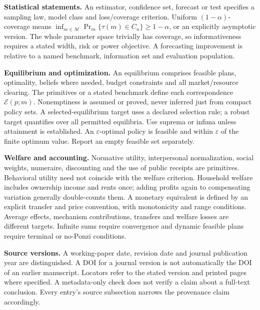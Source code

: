 \documentclass[11pt,a4paper]{article}
\begin{document}
\textbf{Statistical statements.} An estimator, confidence set, forecast or test specifies a sampling law, model class and loss/coverage criterion. Uniform \((1-\alpha)\)-coverage means \(\inf_{m\in\mathcal M}\Pr_m\{\tau(m)\in C_n\}\geq1-\alpha\), or an explicitly asymptotic version. The whole parameter space trivially has coverage, so informativeness requires a stated width, risk or power objective. A forecasting improvement is relative to a named benchmark, information set and evaluation population.

\textbf{Equilibrium and optimization.} An equilibrium comprises feasible plans, optimality, beliefs where needed, budget constraints and all market/resource clearing. The primitives or a stated benchmark define each correspondence \(\mathcal E(p;m)\). Nonemptiness is assumed or proved, never inferred just from compact policy sets. A selected-equilibrium target uses a declared selection rule; a robust target quantifies over all permitted equilibria. Use suprema or infima unless attainment is established. An \(\varepsilon\)-optimal policy is feasible and within \(\varepsilon\) of the finite optimum value. Report an empty feasible set separately.

\textbf{Welfare and accounting.} Normative utility, interpersonal normalization, social weights, numeraire, discounting and the use of public receipts are primitives. Behavioral utility need not coincide with the welfare criterion. Household welfare includes ownership income and rents once; adding profits again to compensating variation generally double-counts them. A monetary equivalent is defined by an explicit transfer and price convention, with monotonicity and range conditions. Average effects, mechanism contributions, transfers and welfare losses are different targets. Infinite sums require convergence and dynamic feasible plans require terminal or no-Ponzi conditions.

\textbf{Source versions.} A working-paper date, revision date and journal publication year are distinguished. A DOI for a journal version is not automatically the DOI of an earlier manuscript. Locators refer to the stated version and printed pages where specified. A metadata-only check does not verify a claim about a full-text conclusion. Every entry's source subsection narrows the provenance claim accordingly.
\end{document}
